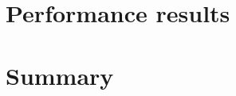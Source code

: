 \documentclass[thesis]{subfiles}
\begin{document}


\chapter{Performance results}







\chapter{Summary}

%
%
%
%
\end{document}
